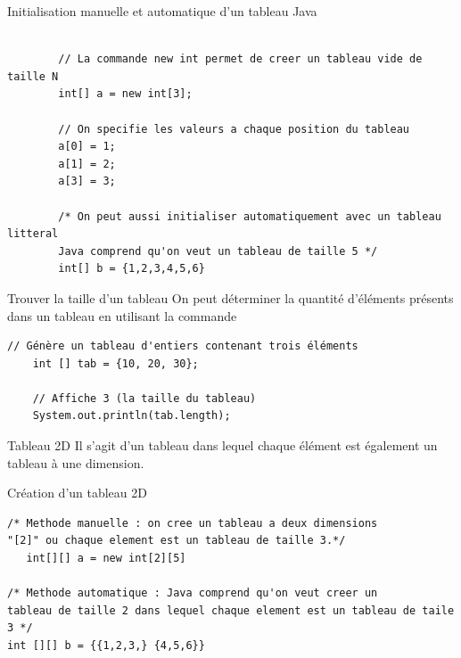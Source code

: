\documentclass{report}
\begin{document}
\begin{EExample*}{Initialisation manuelle et automatique d'un tableau Java}{}
	\begin{lstlisting}[style=JavaDraculaWhite]
		
        // La commande new int permet de creer un tableau vide de taille N
		int[] a = new int[3];

		// On specifie les valeurs a chaque position du tableau 
		a[0] = 1;
		a[1] = 2;
		a[3] = 3;
        
		/* On peut aussi initialiser automatiquement avec un tableau litteral
		Java comprend qu'on veut un tableau de taille 5 */
		int[] b = {1,2,3,4,5,6}
	\end{lstlisting}
\end{EExample*}
\begin{Remarque*}{Trouver la taille d'un tableau}{}
On peut déterminer la quantité d'éléments présents dans un 
tableau en utilisant la commande 
\end{Remarque*}
\begin{EExample*}{}{}
\begin{lstlisting}[style=JavaDraculaWhite]
	// Génère un tableau d'entiers contenant trois éléments 
	int [] tab = {10, 20, 30};

    // Affiche 3 (la taille du tableau)
	System.out.println(tab.length); 

\end{lstlisting}
\end{EExample*}


\begin{Syntaxe*}{Tableau 2D}{}
Il s'agit d'un tableau dans lequel chaque élément est également un tableau à une dimension.  
\end{Syntaxe*}
\begin{EExample*}{Création d'un tableau 2D}{}
\begin{lstlisting}[style=JavaDraculaWhite]
/* Methode manuelle : on cree un tableau a deux dimensions 
"[2]" ou chaque element est un tableau de taille 3.*/ 
   int[][] a = new int[2][5]

/* Methode automatique : Java comprend qu'on veut creer un 
tableau de taille 2 dans lequel chaque element est un tableau de taile 3 */
int [][] b = {{1,2,3,} {4,5,6}}
\end{lstlisting}
\end{EExample*}
\end{document}

